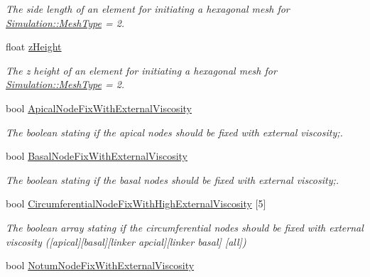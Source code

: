 \begin{DoxyCompactItemize}
\begin{DoxyCompactList}\small\item\em The side length of an element for initiating a hexagonal mesh for \hyperlink{classSimulation_a3dc59b7f2368423781a41b0a457af1e4}{Simulation\+::\+Mesh\+Type} = 2. \end{DoxyCompactList}\item 
\hypertarget{classSimulation_a27aa62c2297902e2e77159fe05362467}{}float \hyperlink{classSimulation_a27aa62c2297902e2e77159fe05362467}{z\+Height}\label{classSimulation_a27aa62c2297902e2e77159fe05362467}

\begin{DoxyCompactList}\small\item\em The z height of an element for initiating a hexagonal mesh for \hyperlink{classSimulation_a3dc59b7f2368423781a41b0a457af1e4}{Simulation\+::\+Mesh\+Type} = 2. \end{DoxyCompactList}\item 
\hypertarget{classSimulation_a27563e2e991aadaf7ff9629c90197459}{}bool \hyperlink{classSimulation_a27563e2e991aadaf7ff9629c90197459}{Apical\+Node\+Fix\+With\+External\+Viscosity}\label{classSimulation_a27563e2e991aadaf7ff9629c90197459}

\begin{DoxyCompactList}\small\item\em The boolean stating if the apical nodes should be fixed with external viscosity;. \end{DoxyCompactList}\item 
\hypertarget{classSimulation_a1898c90a360862484cb379c213640fbc}{}bool \hyperlink{classSimulation_a1898c90a360862484cb379c213640fbc}{Basal\+Node\+Fix\+With\+External\+Viscosity}\label{classSimulation_a1898c90a360862484cb379c213640fbc}

\begin{DoxyCompactList}\small\item\em The boolean stating if the basal nodes should be fixed with external viscosity;. \end{DoxyCompactList}\item 
\hypertarget{classSimulation_a797bef0a4c6e90daf92f51550ee0619e}{}bool \hyperlink{classSimulation_a797bef0a4c6e90daf92f51550ee0619e}{Circumferential\+Node\+Fix\+With\+High\+External\+Viscosity} \mbox{[}5\mbox{]}\label{classSimulation_a797bef0a4c6e90daf92f51550ee0619e}

\begin{DoxyCompactList}\small\item\em The boolean array stating if the circumferential nodes should be fixed with external viscosity (\mbox{[}apical\mbox{]}\mbox{[}basal\mbox{]}\mbox{[}linker apcial\mbox{]}\mbox{[}linker basal\mbox{]} \mbox{[}all\mbox{]}) \end{DoxyCompactList}\item 
\hypertarget{classSimulation_afcdc046caaaf16a43ee646c79902eae1}{}bool \hyperlink{classSimulation_afcdc046caaaf16a43ee646c79902eae1}{Notum\+Node\+Fix\+With\+External\+Viscosity}\label{classSimulation_afcdc046caaaf16a43ee646c79902eae1}


\end{DoxyCompactItemize}
